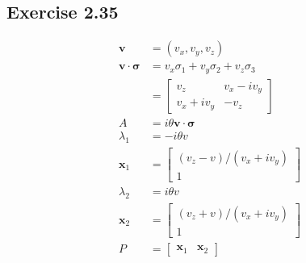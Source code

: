 \documentclass{article}
\renewcommand{\vec}[1]{\boldsymbol{\mathbf{#1}}}
\begin{document}
\subsection*{Exercise 2.35}

\begin{align*}
  \vec{v}                                    & = (v_x, v_y, v_z)                                                   \\
  \vec{v} \cdot \vec{\sigma}                 & = v_x \sigma_1 + v_y \sigma_2 + v_z \sigma_3                        \\
                                             & = \begin{bmatrix}
                                                   v_z         & v_x - i v_y \\
                                                   v_x + i v_y & -v_z
                                                 \end{bmatrix}                                         \\
  A                                          & = i \theta \vec{v} \cdot \vec{\sigma}                               \\
  \lambda_1                                  & = -i \theta v                                                       \\
  \vec{x}_1                                  & = \begin{bmatrix}
                                                   (v_z - v) / (v_x + i v_y) \\
                                                   1
                                                 \end{bmatrix}                                         \\
  \lambda_2                                  & = i \theta v                                                        \\
  \vec{x}_2                                  & = \begin{bmatrix}
                                                   (v_z + v) / (v_x + i v_y) \\
                                                   1
                                                 \end{bmatrix}                                         \\
  P                                          & = \begin{bmatrix}
                                                   \vec{x}_1 & \vec{x}_2

\end{bmatrix}
\end{align*}
\end{document}
